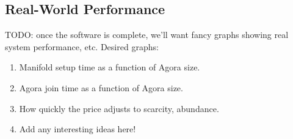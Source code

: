 \subsection{Real-World Performance}

TODO: once the software is complete, we'll want fancy graphs showing
real system performance, etc. Desired graphs:

\begin{enumerate}
\item Manifold setup time as a function of Agora size.
\item Agora join time as a function of Agora size.
\item How quickly the price adjusts to scarcity, abundance.
\item Add any interesting ideas here!
\end{enumerate}
